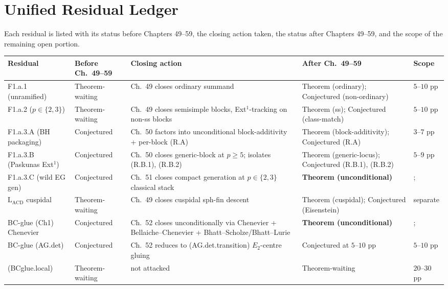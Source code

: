 \section{Unified Residual Ledger}
\label{v4-arith:w5-synth:unified-ledger}

Each residual is listed with its status before Chapters 49--59, the
closing action taken, the status after Chapters 49--59, and the scope
of the remaining open portion.

\begin{center}
\small
\begin{tabular}{p{}|p{}|p{}|p{}|p{}}
Residual & Before Ch.~49--59 & Closing action & After Ch.~49--59 & Scope \\
\hline
F1.a.1 (unramified) & Theorem-waiting & Ch.~49 closes ordinary
summand & Theorem (ordinary); Conjectured (non-ordinary) & \(5\)--\(10\) pp \\
F1.a.2 (\(p\in\{2,3\}\)) & Theorem-waiting & Ch.~49 closes
semisimple blocks, Ext\({}^{1}\)-tracking on non-ss blocks &
Theorem (ss); Conjectured (class-match) & \(5\)--\(10\) pp \\
F1.a.3.A (BH packaging) & Conjectured &
Ch.~50 factors into unconditional block-additivity + per-block
(R.A) & Theorem (block-additivity); Conjectured (R.A) & \(3\)--\(7\) pp \\
F1.a.3.B (Paskunas Ext\({}^{1}\)) & Conjectured &
Ch.~50 closes generic-block at \(p\geq 5\); isolates (R.B.1), (R.B.2)
& Theorem (generic-locus); Conjectured (R.B.1), (R.B.2) & \(5\)--\(9\) pp \\
F1.a.3.C (wild EG gen) & Conjectured &
Ch.~51 closes compact generation at \(p\in\{2,3\}\) classical stack &
\textbf{Theorem (unconditional)} &; \\
\(\mathrm{L}_{\mathrm{ACD}}\) cuspidal & Theorem-waiting & Ch.~49
closes cuspidal sph-fin descent & Theorem (cuspidal); Conjectured
(Eisenstein) & separate \\
BC-glue (Ch1) Chenevier & Conjectured & Ch.~52 closes
unconditionally via Chenevier + Bellaiche--Chenevier +
Bhatt--Scholze/Bhatt--Lurie & \textbf{Theorem (unconditional)} &; \\
BC-glue (AG.det) & Conjectured & Ch.~52 reduces to
(AG.det.transition) \(E_{2}\)-centre gluing &
Conjectured at \(5\)--\(10\) pp & \(5\)--\(10\) pp \\
(BCglue.local) & Theorem-waiting & not attacked &
Theorem-waiting & \(20\)--\(30\) pp \\

\end{tabular}
\end{center}

